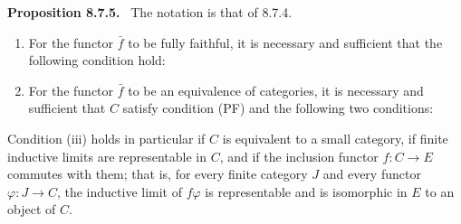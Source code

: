 \documentclass[11pt]{article}
\newcommand{\Ob}{\operatorname{Ob}}
\newcommand{\Hom}{\operatorname{Hom}}
\newenvironment{statement}[1]{\par\medskip\noindent\textbf{#1.}\ }{\par\medskip}
\begin{document}
\begin{statement}{Proposition 8.7.5}
The notation is that of 8.7.4.
\begin{enumerate}[label=\alph*)]
\item For the functor $\bar f$ to be fully faithful, it is necessary and sufficient that the following condition hold:

\item For the functor $\bar f$ to be an equivalence of categories, it is necessary and sufficient that $C$ satisfy condition \textup{(PF)} and the following two conditions:
\end{enumerate}
Condition \textup{(iii)} holds in particular if $C$ is equivalent to a small category, if finite inductive limits are representable in $C$, and if the inclusion functor $f:C\to E$ commutes with them; that is, for every finite category $J$ and every functor $\varphi:J\to C$, the inductive limit of $f\varphi$ is representable and is isomorphic in $E$ to an object of $C$.
\end{statement}
\end{document}
